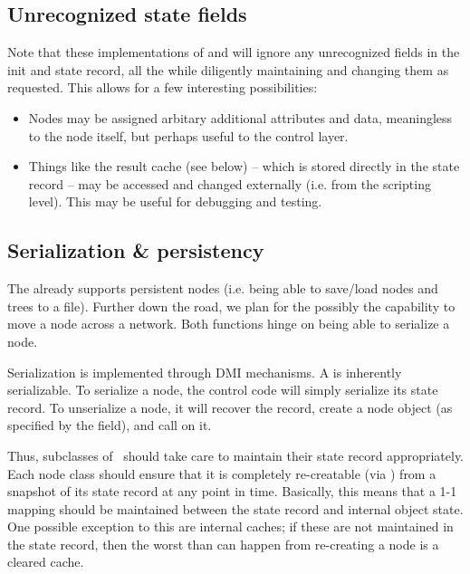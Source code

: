\subsection{Unrecognized state fields}

  Note that these implementations of  and  will
  ignore any unrecognized fields in the init and state record, all the while 
  diligently maintaining and changing them as requested. This allows for a few
  interesting possibilities:

  \begin{itemize}
  
  \item Nodes may be assigned arbitary additional attributes and data,
    meaningless to the node itself, but perhaps useful to the control layer.

  \item Things like the result cache (see below) -- which is stored directly in
    the state record -- may be accessed and changed externally (i.e. from the
    scripting level). This may be useful for debugging and testing.

  \end{itemize}

\subsection{Serialization \& persistency}

  The  already supports persistent nodes (i.e. being able to
  save/load nodes and trees to a file). Further down the road, we plan for the
  possibly the capability to move a node across a network. Both functions hinge
  on being able to serialize a node.

  Serialization is implemented through DMI mechanisms. A  is
  inherently serializable. To serialize a node, the control code will simply
  serialize its state record. To unserialize a node, it will recover the
  record, create a node object (as specified by the  field), and call
   on it. 

  Thus, subclasses of \Node\ should take care to maintain their state record
  appropriately. Each node class should ensure that it is completely
  re-creatable (via ) from a snapshot of its state record at any
  point in time. Basically, this means that a 1-1 mapping should be maintained
  between the state record and internal object state. One possible exception to
  this are internal caches; if these are not maintained in the state record,
  then the worst than can happen from re-creating a node is a cleared cache.
  

